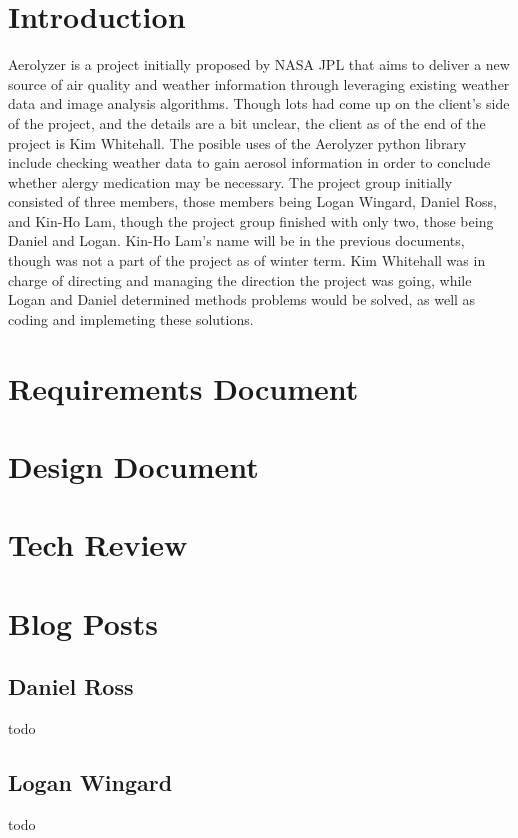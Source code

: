 \documentclass[onecolumn, draftclsnofoot,10pt, compsoc]{IEEEtran}
\begin{document}
\tableofcontents
\clearpage

\begin{singlespace}

	\section{Introduction}
		Aerolyzer is a project initially proposed by NASA JPL that aims to deliver a new source of air quality and weather information through leveraging existing weather data and image analysis algorithms.
		Though lots had come up on the client's side of the project, and the details are a bit unclear, the client as of the end of the project is Kim Whitehall.
		The posible uses of the Aerolyzer python library include checking weather data to gain aerosol information in order to conclude whether alergy medication may be necessary.
		The project group initially consisted of three members, those members being Logan Wingard, Daniel Ross, and Kin-Ho Lam, though the project group finished with only two, those being Daniel and Logan.
		Kin-Ho Lam's name will be in the previous documents, though was not a part of the project as of winter term.
		Kim Whitehall was in charge of directing and managing the direction the project was going, while Logan and Daniel determined methods problems would be solved, as well as coding and implemeting these solutions.
		
	\section{Requirements Document}
		
	\section{Design Document}
		
	\section{Tech Review}
		
	\section{Blog Posts}
		\subsection{Daniel Ross}
			todo
		\subsection{Logan Wingard}
			todo

\end{singlespace}
\end{document}
